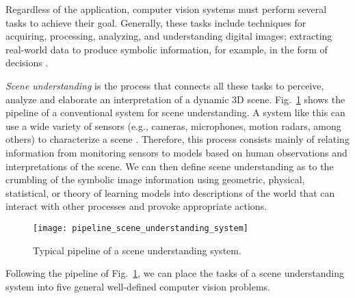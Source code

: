 Regardless of the application, computer vision systems must perform several tasks to achieve their goal. Generally, these tasks include techniques for acquiring, processing, analyzing, and understanding digital images; extracting real-world data to produce symbolic information, for example, in the form of decisions \citep{Wiley.Lucas:IJAI:2018}.

\textit{Scene understanding} is the process that connects all these tasks to perceive, analyze and elaborate an interpretation of a dynamic 3D scene. Fig.\ \ref{fig:scene_understanding_systme_pipeline} shows the pipeline of a conventional system for scene understanding. A system like this can use a wide variety of sensors (e.g., cameras, microphones, motion radars, among others) to characterize a scene \citep{Bremond:HDR:2007}. Therefore, this process consists mainly of relating information from monitoring sensors to models based on human observations and interpretations of the scene. We can then define scene understanding as to the crumbling of the symbolic image information using geometric, physical, statistical, or theory of learning models into descriptions of the world that can interact with other processes and provoke appropriate actions.   

\begin{figure}[!ht]
    \centering
    \texttt{[image: pipeline\_scene\_understanding\_system]}        
    \caption{Typical pipeline of a scene understanding system.}\label{fig:scene_understanding_systme_pipeline}
\end{figure}

Following the pipeline of Fig.\ \ref{fig:scene_understanding_systme_pipeline}, we can place the tasks of a scene understanding system into five general well-defined computer vision problems.

